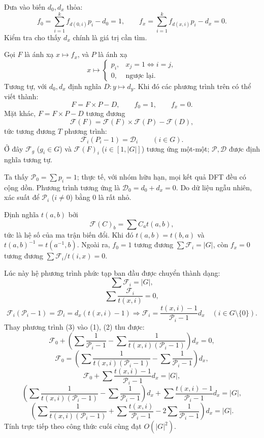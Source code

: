 \documentclass[11pt]{article}
\begin{document}
Đưa vào biến $d_0,d_x$ thỏa:
\[
  f_0=\sum_{i=1}^{k} f_{d(0,i)}p_i-d_0=1,\qquad
  f_x=\sum_{i=1}^{k} f_{d(x,i)}p_i-d_x=0.
\]
Kiểm tra cho thấy $d_x$ chính là giá trị cần tìm.

Gọi $F$ là ánh xạ $x\mapsto f_x$, và $P$ là ánh xạ
\[
  x\mapsto
  \begin{cases}
    p_i,& x_j=1\Longleftrightarrow i=j,\\
    0,& \text{ngược lại}.
  \end{cases}
\]
Tương tự, với $d_0,d_x$ định nghĩa $D:y\mapsto d_y$. Khi đó các phương trình
trên có thể viết thành:
\[
  F=F\times P-D,\qquad f_0=1,\qquad f_x=0.
\]
Mặt khác, $F=F\times P-D$ tương đương
\[
  \mathcal F(F)=\mathcal F(F)\times\mathcal F(P)-\mathcal F(D),
\]
tức tương đương $T$ phương trình:
\[
  \mathcal F_i(P_i-1)=\mathcal D_i\qquad (i\in G).
\]
Ở đây $\mathcal F_g$ ($g_i\in G$) và $\mathcal F(F)_i$ ($i\in[1,|G|]$) tương
ứng một-một; $\mathcal P,\mathcal D$ được định nghĩa tương tự.

Ta thấy $\mathcal P_0=\sum p_i=1$; thực tế, với nhóm hữu hạn, mọi kết quả DFT
đều có cộng dồn. Phương trình tương ứng là
$\mathcal D_0=d_0+d_x=0$. Do dữ liệu ngẫu nhiên, xác suất để $\mathcal P_i$
($i\ne0$) bằng $0$ là rất nhỏ.

Định nghĩa $t(a,b)$ bởi
\[
  \mathcal F(C)_b=\sum C_a t(a,b),
\]
tức là hệ số của ma trận biến đổi. Khi đó
$t(a,b)=t(b,a)$ và $t(a,b)^{-1}=t(a^{-1},b)$. Ngoài ra, $f_0=1$ tương đương
$\sum\mathcal F_i=|G|$, còn $f_x=0$ tương đương
$\sum\mathcal F_i/t(i,x)=0$.

Lúc này hệ phương trình phức tạp ban đầu được chuyển thành dạng:
\[
  \sum \mathcal F_i=|G|, \tag{1}
\]
\[
  \sum \frac{\mathcal F_i}{t(x,i)}=0, \tag{2}
\]
\[
  \mathcal F_i(\mathcal P_i-1)=\mathcal D_i
  =d_x(t(x,i)-1)
  \Rightarrow
  \mathcal F_i=\frac{t(x,i)-1}{\mathcal P_i-1}d_x
  \quad (i\in G\setminus\{0\}). \tag{3}
\]
Thay phương trình (3) vào (1), (2) thu được:
\[
  \mathcal F_0+
  \left(\sum\frac{1}{\mathcal P_i-1}
  -\sum\frac{1}{t(x,i)(\mathcal P_i-1)}\right)d_x=0,
\]
\[
  \mathcal F_0=
  \left(\sum\frac{1}{t(x,i)(\mathcal P_i-1)}
  -\sum\frac{1}{\mathcal P_i-1}\right)d_x,
\]
\[
  \mathcal F_0+\sum\frac{t(x,i)-1}{\mathcal P_i-1}d_x=|G|,
\]
\[
  \left(\sum\frac{1}{t(x,i)(\mathcal P_i-1)}
  -\sum\frac{1}{\mathcal P_i-1}\right)d_x
  +\sum\frac{t(x,i)-1}{\mathcal P_i-1}d_x=|G|,
\]
\[
  \left(\sum\frac{1}{t(x,i)(\mathcal P_i-1)}
  +\sum\frac{t(x,i)}{\mathcal P_i-1}
  -2\sum\frac{1}{\mathcal P_i-1}\right)d_x=|G|.
\]
Tính trực tiếp theo công thức cuối cùng đạt $O(|G|^2)$.
\end{document}
